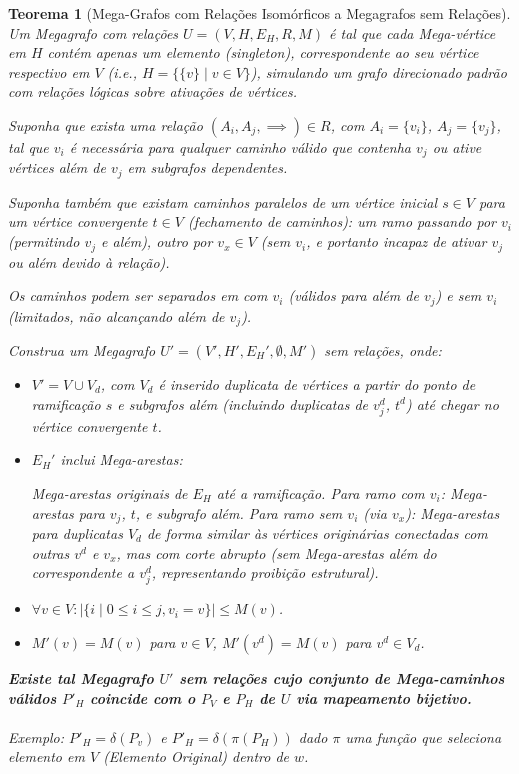 \documentclass{article}
\newtheorem{theorem}{Teorema}
\begin{document}
\begin{theorem}[Mega-Grafos com Relações Isomórficos a Megagrafos sem Relações]
Um Megagrafo com relações \( U = (V, H, E_H, R, M) \) é tal que cada Mega-vértice em \( H \) contém apenas um elemento (singleton), correspondente ao seu vértice respectivo em \( V \) (i.e., \( H = \{ \{v\} \mid v \in V \} \)), simulando um grafo direcionado padrão com relações lógicas sobre ativações de vértices.

Suponha que exista uma relação \( (A_i, A_j, \implies) \in R \), com \( A_i = \{v_i\} \), \( A_j = \{v_j\} \), tal que \( v_i \) é necessária para qualquer caminho válido que contenha \( v_j \) ou ative vértices além de \( v_j \) em subgrafos dependentes.

Suponha também que existam caminhos paralelos de um vértice inicial \( s \in V \) para um vértice convergente \( t \in V \) (fechamento de caminhos): um ramo passando por \( v_i \) (permitindo \( v_j \) e além), outro por \( v_x \in V \) (sem \( v_i \), e portanto incapaz de ativar \( v_j \) ou além devido à relação).

Os caminhos podem ser separados em com \( v_i \) (válidos para além de \( v_j \)) e sem \( v_i \) (limitados, não alcançando além de \( v_j \)).

Construa um Megagrafo \( U' = (V', H', E_H', \emptyset, M') \) sem relações, onde:

\begin{itemize}
    \item \( V' = V \cup V_d \), com \( V_d \) é inserido duplicata de vértices a partir do ponto de ramificação \( s \) e subgrafos além (incluindo duplicatas de \( v_j^d \), \( t^d \)) até chegar no vértice convergente \( t \).
    \item \( E_H' \) inclui Mega-arestas:

    \subitem Mega-arestas originais de \( E_H \) até a ramificação.
    \subitem Para ramo com \( v_i \): Mega-arestas para \( v_j \), \( t \), e subgrafo além.
    \subitem Para ramo sem \( v_i \) (via \( v_x \)): Mega-arestas para duplicatas \( V_d \) de forma similar às vértices originárias conectadas com outras \( v^d \) e \( v_x \), mas com corte abrupto (sem Mega-arestas além do correspondente a \( v_j^d \), representando proibição estrutural).

    \item \( \forall v \in V: |\{ i \mid 0 \leq i \leq j, v_i = v \}| \leq M(v) \).
    \item \( M'(v) = M(v) \) para \( v \in V \), \( M'(v^d) = M(v) \) para \( v^d \in V_d \).
\end{itemize}


\textbf{Existe tal Megagrafo \( U' \) sem relações cujo conjunto de Mega-caminhos válidos \( P'_H \) coincide com o \( P_V \) e \( P_H \) de \( U \) via mapeamento bijetivo.}
\\
\\
Exemplo: \( P'_H = \delta(P_v) \) e \( P'_H = \delta(\pi(P_H)) \) dado \( \pi \) uma função que seleciona elemento em \( V \) (Elemento Original) dentro de \( w \).
\end{theorem}
\end{document}
